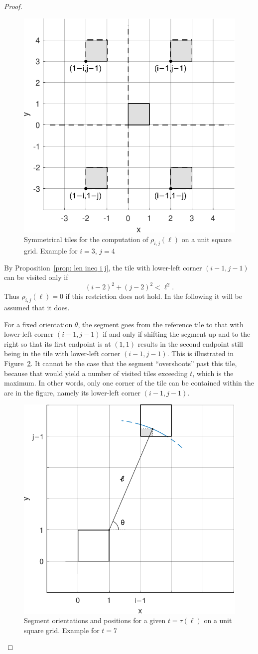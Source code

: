 \documentclass[12pt, a4paper]{article}
\newcommand{\funt}{\tau} %
\newcommand{\probmax}{\rho} %
\newcommand{\len}{\ell} %
\newcommand{\tiles}{t} %
\begin{document}
\begin{proof}
\begin{figure}
\centering%
\includegraphics[width=.53\textwidth]{probmax_symmetric_tiles}%
\caption{Symmetrical tiles for the computation of $\probmax_{i,j}(\len)$ on a unit square grid. Example for $i=3$, $j=4$%
}%
\label{fig: probmax_symmetric_tiles}%
\end{figure}%

By Proposition~\ref{prop: len ineq i j}, the tile with lower-left corner $(i-1,j-1)$ can be visited only if
\begin{equation}
\label{eq: i-2 j-2 len}
(i-2)^2+(j-2)^2<\len^2.
\end{equation}
Thus $\probmax_{i,j}(\len)=0$ if this restriction does not hold. In the following it will be assumed that it does.

For a fixed orientation $\theta$, the segment goes from the reference tile to that with lower-left corner $(i-1,j-1)$ if and only if shifting the segment up and to the right so that its first endpoint is at $(1,1)$ results in the second endpoint still being in the tile with lower-left corner $(i-1,j-1)$. This is illustrated in Figure~\ref{fig: probmax_funt_odd}. It cannot be the case that the segment ``overshoots'' past this tile, because that would yield a number of visited tiles exceeding $\tiles$, which is the maximum. In other words, only one corner of the tile can be contained within the arc in the figure, namely its lower-left corner $(i-1,j-1)$.

\begin{figure}
\centering
\includegraphics[width=.56\textwidth]{probmax_funt_odd}%
\caption{Segment orientations and positions for a given $\tiles = \funt(\len)$ on a unit square grid. Example for $\tiles = 7$
}%
\label{fig: probmax_funt_odd}%
\end{figure}%


\end{proof}
\end{document}
